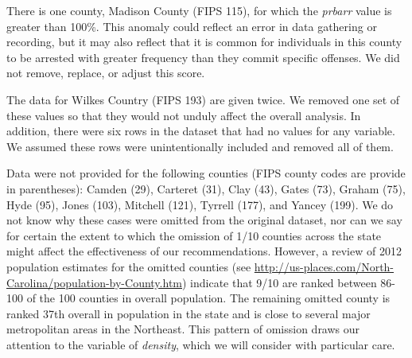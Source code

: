 \documentclass[]{article}
\begin{document}
There is one county, Madison County (FIPS 115), for which the
\emph{prbarr} value is greater than 100\%. This anomaly could reflect an
error in data gathering or recording, but it may also reflect that it is
common for individuals in this county to be arrested with greater
frequency than they commit specific offenses. We did not remove,
replace, or adjust this score.

The data for Wilkes Country (FIPS 193) are given twice. We removed one
set of these values so that they would not unduly affect the overall
analysis. In addition, there were six rows in the dataset that had no
values for any variable. We assumed these rows were unintentionally
included and removed all of them.

Data were not provided for the following counties (FIPS county codes are
provide in parentheses): Camden (29), Carteret (31), Clay (43), Gates
(73), Graham (75), Hyde (95), Jones (103), Mitchell (121), Tyrrell
(177), and Yancey (199). We do not know why these cases were omitted
from the original dataset, nor can we say for certain the extent to
which the omission of 1/10 counties across the state might affect the
effectiveness of our recommendations. However, a review of 2012
population estimates for the omitted counties (see
\url{http://us-places.com/North-Carolina/population-by-County.htm})
indicate that 9/10 are ranked between 86-100 of the 100 counties in
overall population. The remaining omitted county is ranked 37th overall
in population in the state and is close to several major metropolitan
areas in the Northeast. This pattern of omission draws our attention to
the variable of \emph{density}, which we will consider with particular
care.
\end{document}

